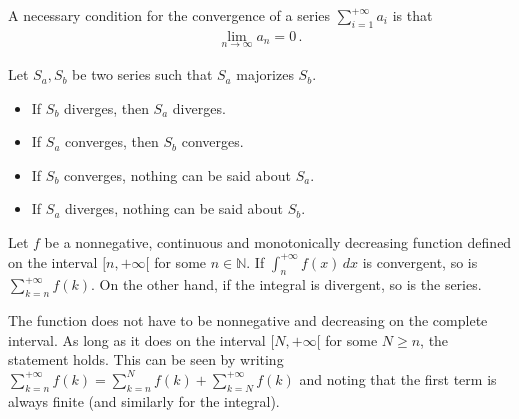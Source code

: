     \begin{property}
        A necessary condition for the convergence of a series $\sum_{i=1}^{+\infty}a_i$ is that
        \begin{gather}
            \lim_{n\rightarrow\infty}a_n=0\,.
        \end{gather}
    \end{property}


    \begin{method}
        Let $S_a,S_b$ be two series such that $S_a$ majorizes $S_b$.
        \begin{itemize}
            \item If $S_b$ diverges, then $S_a$ diverges.
            \item If $S_a$ converges, then $S_b$ converges.
            \item If $S_b$ converges, nothing can be said about $S_a$.
            \item If $S_a$ diverges, nothing can be said about $S_b$.
        \end{itemize}
    \end{method}

    \begin{method}
        Let $f$ be a nonnegative, continuous and monotonically decreasing function defined on the interval $[n,+\infty[$ for some $n\in\mathbb{N}$. If $\int_n^{+\infty}f(x)\,dx$ is convergent, so is $\sum_{k=n}^{+\infty}f(k)$. On the other hand, if the integral is divergent, so is the series.
    \end{method}
    \begin{remark}
        The function does not have to be nonnegative and decreasing on the complete interval. As long as it does on the interval $[N,+\infty[$ for some $N\geq n$, the statement holds. This can be seen by writing $\sum_{k=n}^{+\infty}f(k) = \sum_{k=n}^Nf(k) + \sum_{k=N}^{+\infty}f(k)$ and noting that the first term is always finite (and similarly for the integral).
    \end{remark}

